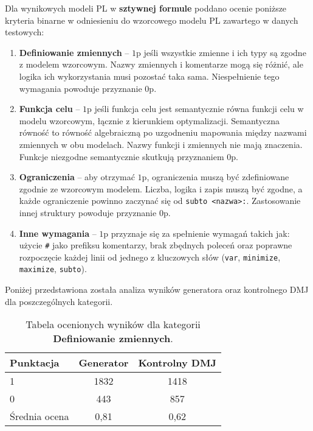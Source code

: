 Dla wynikowych modeli PL w \textbf{sztywnej formule} poddano ocenie poniższe kryteria binarne w odniesieniu do wzorcowego modelu PL zawartego w danych testowych:

\begin{enumerate}
\item \textbf{Definiowanie zmiennych} -- $1$p jeśli wszystkie zmienne i ich typy są zgodne z modelem wzorcowym. Nazwy zmiennych i komentarze mogą się różnić, ale logika ich wykorzystania musi pozostać taka sama. Niespełnienie tego wymagania powoduje przyznanie $0$p. %
\item \textbf{Funkcja celu} -- $1$p jeśli funkcja celu jest semantycznie równa funkcji celu w modelu wzorcowym, łącznie z kierunkiem optymalizacji. Semantyczna równość to równość algebraiczną po uzgodneniu mapowania między nazwami zmiennych w obu modelach. Nazwy funkcji i zmiennych nie mają znaczenia. Funkcje niezgodne semantycznie skutkują przyznaniem $0$p.
\item \textbf{Ograniczenia} -- aby otrzymać $1$p, ograniczenia muszą być zdefiniowane zgodnie ze wzorcowym modelem. Liczba, logika i zapis muszą być zgodne, a każde ograniczenie powinno zaczynać się od \texttt{subto <nazwa>:}. Zastosowanie innej struktury powoduje przyznanie $0$p.
\item \textbf{Inne wymagania} -- $1$p przyznaje się za spełnienie wymagań takich jak: użycie \texttt{\#} jako prefiksu komentarzy, brak zbędnych poleceń oraz poprawne rozpoczęcie każdej linii od jednego z kluczowych słów (\texttt{var}, \texttt{minimize}, \texttt{maximize}, \texttt{subto}). %
\end{enumerate}

Poniżej przedstawiona została analiza wyników generatora oraz kontrolnego DMJ dla poszczególnych kategorii.

\begin{table}[ht]
\caption{Tabela ocenionych wyników dla kategorii \textbf{Definiowanie zmiennych}.}\label{tab:tabela12}
\centering%
\begin{tabular}{|l|c|c|}
\hline
\textbf{Punktacja} & \textbf{Generator} & \textbf{Kontrolny DMJ}\\
\hline
1 & 1832 & 1418 \\
\hline
0 & 443 & 857 \\
\hline
Średnia ocena & 0,81 & 0,62 \\
\hline
\end{tabular}
\end{table}

